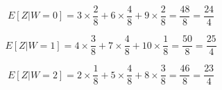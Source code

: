 \begin{questions}
\begin{solution}
\begin{parts}
\begin{equation}
E[Z|W=0] = 3 \times \frac{2}{8} + 6 \times \frac{4}{8} + 9 \times \frac{2}{8} = \frac{48}{8} = \frac{24}{4}
\end{equation}

\begin{equation}
E[Z|W=1] = 4 \times \frac{3}{8} + 7 \times \frac{4}{8} + 10 \times \frac{1}{8} = \frac{50}{8} = \frac{25}{4}
\end{equation}

\begin{equation}
E[Z|W=2] = 2 \times \frac{1}{8} + 5 \times \frac{4}{8} + 8 \times \frac{3}{8} = \frac{46}{8} = \frac{23}{4}
\end{equation}


\end{parts}
\end{solution}
\end{questions}
